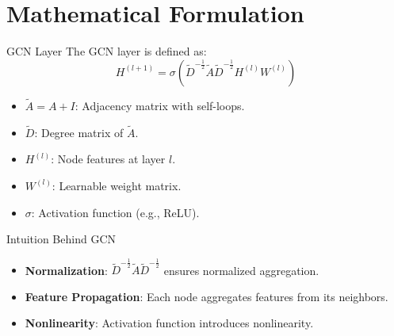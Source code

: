 \documentclass{beamer}
\begin{document}
\section{Mathematical Formulation}
\begin{frame}{GCN Layer}
    The GCN layer is defined as:
    \[
    H^{(l+1)} = \sigma\left(\tilde{D}^{-\frac{1}{2}} \tilde{A} \tilde{D}^{-\frac{1}{2}} H^{(l)} W^{(l)}\right)
    \]
    \begin{itemize}
        \item \(\tilde{A} = A + I\): Adjacency matrix with self-loops.
        \item \(\tilde{D}\): Degree matrix of \(\tilde{A}\).
        \item \(H^{(l)}\): Node features at layer \(l\).
        \item \(W^{(l)}\): Learnable weight matrix.
        \item \(\sigma\): Activation function (e.g., ReLU).
    \end{itemize}
\end{frame}

\begin{frame}{Intuition Behind GCN}
    \begin{itemize}
        \item \textbf{Normalization}: \(\tilde{D}^{-\frac{1}{2}} \tilde{A} \tilde{D}^{-\frac{1}{2}}\) ensures normalized aggregation.
        \item \textbf{Feature Propagation}: Each node aggregates features from its neighbors.
        \item \textbf{Nonlinearity}: Activation function introduces nonlinearity.
    \end{itemize}
\end{frame}




\end{document}
